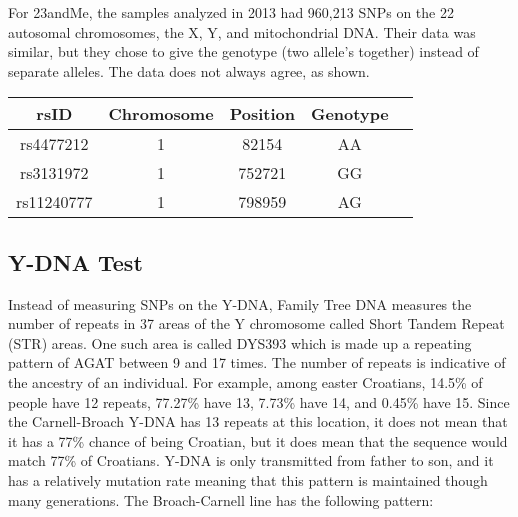 \documentclass[11pt,letter]{book}
\begin{document}
For 23andMe, the samples analyzed in 2013 had 960,213 SNPs on the 22 autosomal chromosomes, the X, Y, and mitochondrial DNA.  Their data was similar, but they chose to give the genotype (two allele's together) instead of separate alleles.  The data does not always agree, as shown.

\begin{center}
\begin{tabular}{c | c | c | c | c}
	rsID & Chromosome & Position & Genotype \\
	\hline
	rs4477212 & 1 & 82154 & AA \\
	rs3131972 & 1 & 752721 & GG \\
	rs11240777 & 1 & 798959 & AG \\
\end{tabular}
\end{center}

\subsection{Y-DNA Test}

Instead of measuring SNPs on the Y-DNA, Family Tree DNA measures the number of repeats in 37 areas of the Y chromosome called Short Tandem Repeat (STR) areas.  One such area is called DYS393 which is made up a repeating pattern of AGAT between 9 and 17 times.  The number of repeats is indicative of the ancestry of an individual.  For example, among easter Croatians, 14.5\% of people have 12 repeats, 77.27\% have 13, 7.73\% have 14, and 0.45\% have 15.  Since the Carnell-Broach Y-DNA has 13 repeats at this location, it does not mean that it has a 77\% chance of being Croatian, but it does mean that the sequence would match 77\% of Croatians.
Y-DNA is only transmitted from father to son, and it has a relatively mutation rate meaning that this pattern is maintained though many generations.  The Broach-Carnell line has the following pattern:
\end{document}
